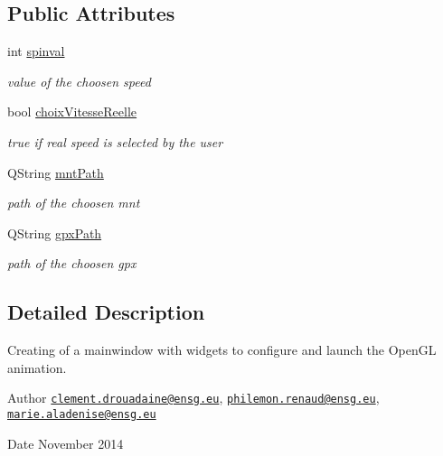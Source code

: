\subsection*{Public Attributes}
\begin{DoxyCompactItemize}
\item 
int \hyperlink{classmafenetre_a64a51218343d46e32cdf6d8ff41c1919}{spinval}
\begin{DoxyCompactList}\small\item\em value of the choosen speed \end{DoxyCompactList}\item 
bool \hyperlink{classmafenetre_ac66e90f34e0f0dc5a9bb2e43c7acfe90}{choix\+Vitesse\+Reelle}
\begin{DoxyCompactList}\small\item\em true if real speed is selected by the user \end{DoxyCompactList}\item 
Q\+String \hyperlink{classmafenetre_af9607457086703b72098cc05d5b9a553}{mnt\+Path}
\begin{DoxyCompactList}\small\item\em path of the choosen mnt \end{DoxyCompactList}\item 
Q\+String \hyperlink{classmafenetre_af0c130d9533f8f43e363c7b5c4496b91}{gpx\+Path}
\begin{DoxyCompactList}\small\item\em path of the choosen gpx \end{DoxyCompactList}\end{DoxyCompactItemize}


\subsection{Detailed Description}
Creating of a mainwindow with widgets to configure and launch the Open\+G\+L animation. 

\begin{DoxyAuthor}{Author}
\href{mailto:clement.drouadaine@ensg.eu}{\tt clement.\+drouadaine@ensg.\+eu}, \href{mailto:philemon.renaud@ensg.eu}{\tt philemon.\+renaud@ensg.\+eu}, \href{mailto:marie.aladenise@ensg.eu}{\tt marie.\+aladenise@ensg.\+eu} 
\end{DoxyAuthor}
\begin{DoxyDate}{Date}
November 2014 
\end{DoxyDate}


